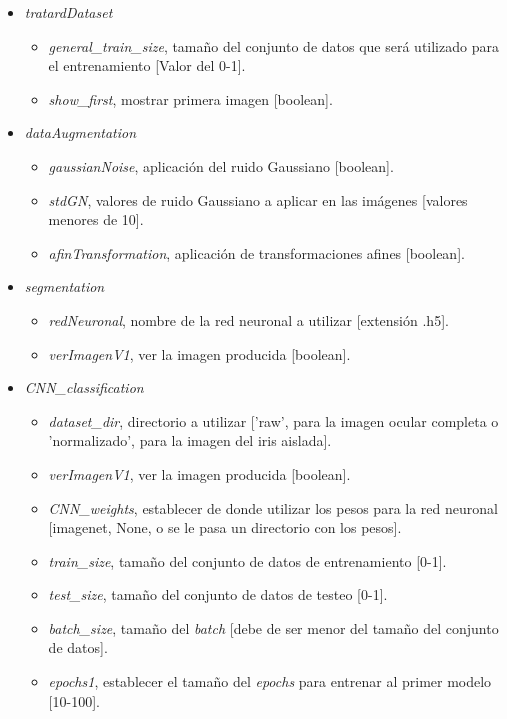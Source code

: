 {\begin{itemize}
    \item \textit{tratardDataset}
    \begin{itemize}
        \item \textit{general\_train\_size}, tamaño del conjunto de datos que será utilizado para el entrenamiento [Valor del 0-1].
        \item \textit{show\_first}, mostrar primera imagen [boolean].
    \end{itemize}
    \item \textit{dataAugmentation}
    \begin{itemize}
        \item \textit{gaussianNoise}, aplicación del ruido Gaussiano [boolean].
        \item \textit{stdGN}, valores de ruido Gaussiano a aplicar en las imágenes [valores menores de 10].
        \item \textit{afinTransformation}, aplicación de transformaciones afines [boolean].
    \end{itemize}
    \item \textit{segmentation}
    \begin{itemize}
        \item \textit{redNeuronal}, nombre de la red neuronal a utilizar [extensión .h5].
        \item \textit{verImagenV1}, ver la imagen producida [boolean].
    \end{itemize}
    \item \textit{CNN\_classification}
    \begin{itemize}
        \item \textit{dataset\_dir}, directorio a utilizar ['raw', para la imagen ocular completa o 'normalizado', para la imagen del iris aislada].
        \item \textit{verImagenV1}, ver la imagen producida [boolean].
        \item \textit{CNN\_weights}, establecer de donde utilizar los pesos para la red neuronal [imagenet, None, o se le pasa un directorio con los pesos].
        \item \textit{train\_size}, tamaño del conjunto de datos de entrenamiento [0-1].
        \item \textit{test\_size}, tamaño del conjunto de datos de testeo [0-1].
        \item \textit{batch\_size}, tamaño del \textit{batch} [debe de ser menor del tamaño del conjunto de datos].
        \item \textit{epochs1}, establecer el tamaño del \textit{epochs} para entrenar al primer modelo [10-100].

\end{itemize}
\end{itemize}}
